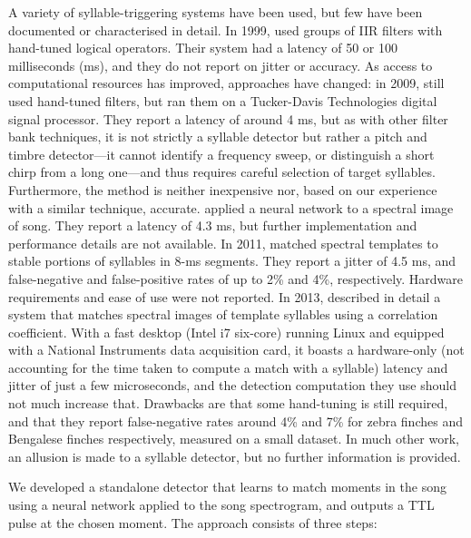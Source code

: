 \documentclass[10pt,letterpaper]{article}
\begin{document}
A variety of syllable-triggering systems have been used, but few have been documented or characterised in detail.  In 1999, \cite{Leonardo1999}  used groups of IIR filters with hand-tuned logical operators.  Their system had a latency of 50 or 100 milliseconds (ms), and they do not report on jitter or accuracy.  As access to computational resources has improved, approaches have changed: in 2009, \cite{Andalman2009} still used hand-tuned filters, but ran them on a Tucker-Davis Technologies digital signal processor.  They report a latency of around 4 ms, but as with other filter bank techniques, it is not strictly a syllable detector but rather a pitch and timbre detector---it cannot identify a frequency sweep, or distinguish a short chirp from a long one---and thus requires careful selection of target syllables.  Furthermore, the method is neither inexpensive nor, based on our experience with a similar technique, accurate.  \cite{Keller2009} applied a neural network to a spectral image of song.  They report a latency of 4.3 ms, but further implementation and performance details are not available.  In 2011, \cite{Warren2011} matched spectral templates to stable portions of syllables in 8-ms segments.  They report a jitter of 4.5 ms, and false-negative and false-positive rates of up to 2\% and 4\%, respectively.  Hardware requirements and ease of use were not reported.  In 2013, \cite{Skocik2013} described in detail a system that matches spectral images of template syllables using a correlation coefficient.  With a fast desktop (Intel i7 six-core) running Linux and equipped with a National Instruments data acquisition card, it boasts a hardware-only (not accounting for the time taken to compute a match with a syllable) latency and jitter of just a few microseconds, and the detection computation they use should not much increase that.  Drawbacks are that some hand-tuning is still required, and that they report false-negative rates around 4\% and 7\% for zebra finches and Bengalese finches respectively, measured on a small dataset.  In much other work, an allusion is made to a syllable detector, but no further information is provided.

We developed a standalone detector that learns to match moments in the
song using a neural network applied to the song spectrogram, and
outputs a TTL pulse at the chosen moment. The approach consists of
three steps:
\end{document}
